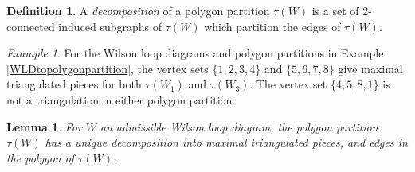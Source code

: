\documentclass[11pt]{article}
\newtheorem{lem}[thm]{Lemma}
\theoremstyle{remark}
\newtheorem{eg}[thm]{Example}
\theoremstyle{definition}
\newtheorem{dfn}[thm]{Definition}
\begin{document}
\begin{dfn}
 A {\em decomposition} of a polygon partition $\tau(W)$ is a set of 2-connected induced subgraphs of $\tau(W)$ which partition the edges of $\tau(W)$.  
\end{dfn}

\begin{eg} \label{eg: unique decomposition} For the Wilson loop diagrams and polygon partitions in Example \ref{WLDtopolygonpartition}, the vertex sets $\{1, 2, 3,4\}$ and $\{5, 6, 7, 8\}$ give maximal triangulated pieces for both $\tau(W_1)$ and $\tau(W_3)$. The vertex set $\{4,5, 8, 1\}$ is not a triangulation in either polygon partition. 
\end{eg}

\begin{lem} \label{decompositionlem}
  For $W$ an admissible Wilson loop diagram, the polygon partition $\tau(W)$ has a unique decomposition into maximal triangulated pieces, and edges in the polygon of $\tau(W)$.
\end{lem}
\end{document}
